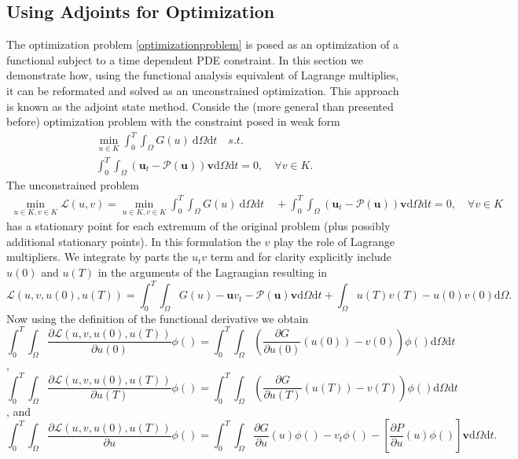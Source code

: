 \documentclass[10pt]{article}
\renewcommand{\d}{\mathrm{d}}
\newcommand{\vect}[1]{\mathbf{#1} }
\newcommand{\Lagrangian}{{\mathcal{L}}}
\begin{document}
\subsection{Using Adjoints for Optimization}

The optimization problem \ref{optimizationproblem} is posed as an optimization of a functional subject to a time dependent PDE constraint.
In this section we demonstrate how, using the functional analysis equivalent of Lagrange multiplies, it can be reformated and solved as
an unconstrained optimization. This approach is known as the adjoint state method. Conside the (more general than presented before)
optimization problem with the constraint posed in weak form
\begin{eqnarray}
  \min_{u \in K} \int_0^T\int_{\Omega}G(u) \ \d \Omega \d t \quad s.t. \\ \nonumber
  \int_0^T \int_{\Omega} (\mathbf u_t-\mathcal P(\vect u)) \mathbf v \d \Omega \d t = 0, \quad \forall v \in K.
\label{newoptimizationproblem}
\end{eqnarray}
The unconstrained problem
\begin{eqnarray}
  \min_{u \in K, v \in K} \Lagrangian(u,v) = \min_{u \in K, v \in K} \int_0^T\int_{\Omega}G(u) \ \d \Omega \d t \quad +  \int_0^T \int_{\Omega} (\mathbf u_t-\mathcal P(\vect u)) \mathbf v \d \Omega \d t = 0, \quad \forall v \in K
\label{unconstrainedoptimizationproblem}
\end{eqnarray}
has a stationary point for each extremum of the original problem (plus possibly additional stationary points). In this formulation the $ v$ play the role of
Lagrange multipliers. We integrate by parts the $ u_t v $ term and for clarity explicitly include $ u(0) $ and $ u(T) $ in the arguments of the Lagrangian resulting in
\[
\Lagrangian(u,v,u(0),u(T)) = \int_0^T\int_{\Omega}G(u) - \mathbf u v_t-\mathcal P(\vect u) \mathbf v \d \Omega \d t + \int_{\Omega} u(T)v(T) - u(0) v(0) \d \Omega.
\]
Now using the definition of the functional derivative we obtain
\[
\int_0^T\int_{\Omega} \frac{\partial \Lagrangian(u,v,u(0),u(T))}{\partial u(0)}\phi() = \int_0^T\int_{\Omega} (\frac{\partial G}{\partial u(0)}(u(0)) - v(0))\phi() \d \Omega \d t
\],
\[
\int_0^T\int_{\Omega} \frac{\partial \Lagrangian(u,v,u(0),u(T))}{\partial u(T)}\phi() = \int_0^T\int_{\Omega} (\frac{\partial G}{\partial u(T)}(u(T)) - v(T))\phi() \d \Omega \d t
\], and 
\[
\int_0^T\int_{\Omega} \frac{\partial \Lagrangian(u,v,u(0),u(T))}{\partial u}\phi() = \int_0^T\int_{\Omega}\frac{\partial G}{\partial u}(u)\phi() -  v_t\phi() - [\frac{\partial P}{\partial u}(u)\phi()] \mathbf v \d \Omega \d t.
\]
\end{document}
